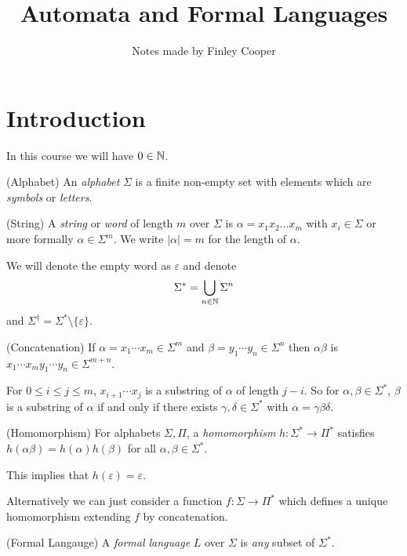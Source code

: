 \documentclass[tikx, border = 10pt]{article}
\title{Automata and Formal Languages}
\author{Notes made by Finley Cooper}
\begin{document}
  \maketitle
  \newpage
  \tableofcontents
  \newpage
  \section{Introduction}
  In this course we will have $ 0\in \mathbb{N} $.
\begin{definition}
	(Alphabet) An \textit{alphabet} $ \Sigma $ is a finite non-empty set with elements which are \textit{symbols} or \textit{letters}.
\end{definition}
\begin{definition}
	(String) A \textit{string} or \textit{word} of length $ m $ over $ \Sigma $ is $ \alpha = x_1x_2\dots x_m $ with $ x_i\in \Sigma $ or more formally $ \alpha \in\Sigma^m $. We write $ |\alpha| = m $ for the length of $ \alpha $.
\end{definition}
\begin{remark}
  We will denote the empty word as $ \varepsilon $ and denote
  \[
	  \Sigma^* = \bigcup_{n\in \mathbb{N}}\Sigma^n
  \]
  and $ \Sigma^\dagger = \Sigma^* \setminus \{\varepsilon\} $.
\end{remark}
\begin{definition}
	(Concatenation) If $ \alpha = x_1\cdots x_m\in \Sigma^m $ and $ \beta= y_1\cdots y_n\in \Sigma^n $ then $ \alpha\beta $ is $ x_1\cdots x_my_1\cdots y_n \in \Sigma^{m+n} $.
\end{definition}
For $ 0\le i \le j \le m $, $ x_{i+1}\cdots x_j $ is a substring of $ \alpha $ of length $ j-i $. So for $ \alpha,\beta\in \Sigma^* $, $\beta $ is a substring of $ \alpha $ if and only if there exists $ \gamma,\delta\in\Sigma^* $ with $ \alpha = \gamma\beta\delta $.
\begin{definition}
	(Homomorphism) For alphabets $ \Sigma, \Pi $, a \textit{homomorphism} $ h: \Sigma^* \to \Pi^* $ satisfies $ h(\alpha\beta) = h(\alpha)h(\beta) $ for all $ \alpha,\beta\in \Sigma^* $.
\end{definition}
\begin{remark}
  This implies that $ h(\varepsilon) = \varepsilon $. 
\end{remark}
\begin{remark}
  Alternatively we can just consider a function $ f : \Sigma \to \Pi^*$ which defines a unique homomorphism extending $ f $ by concatenation.
\end{remark}
\begin{definition}
	(Formal Langauge) A \textit{formal language} $ L $ over $ \Sigma $ is \textit{any} subset of $ \Sigma^* $.
\end{definition}
\end{document}

